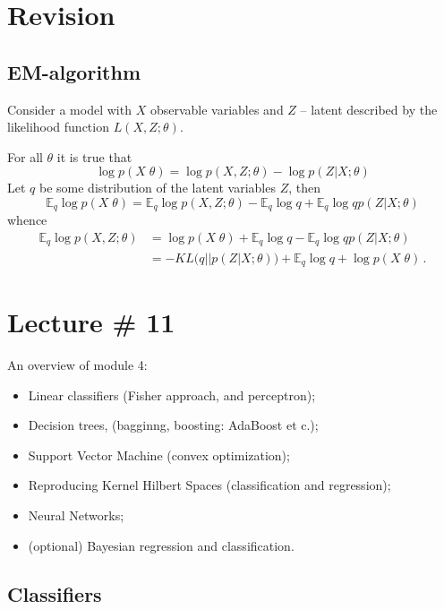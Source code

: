 \documentclass[a4paper]{article}
\newcommand{\ex}{\mathbb{E}}
\begin{document}
\section{Revision} %
\label{sec:revision}

\subsection{EM-algorithm} %
\label{sub:em_algorithm}

Consider a model with $X$ observable variables and $Z$ -- latent described by
the likelihood function $L(X,Z;\theta)$.

For all $\theta$ it is true that 
\[\log p(X\;\theta) = \log p(X,Z;\theta) - \log p(Z\lvert X;\theta)\]
Let $q$ be some distribution of the latent variables $Z$, then
\[ \ex_q\log p(X\;\theta) = \ex_q\log p(X,Z;\theta) - \ex_q \log q + \ex_q\log {q}{p(Z\lvert X;\theta)} \]
whence 
\begin{align*}
\ex_q\log p(X,Z;\theta)
	&= \log p(X\;\theta) + \ex_q \log q - \ex_q\log {q}{p(Z\lvert X;\theta)} \\
	&= - KL\bigl(q\lvert\rvert p(Z\lvert X;\theta)\bigr) + \ex_q \log q + \log p(X\;\theta) \,.
\end{align*}



\section{Lecture \# 11} %
\label{sec:lecture_11}

An overview of module 4:
\begin{itemize}
	\item Linear classifiers (Fisher approach, and perceptron);
	\item Decision trees, (bagginng, boosting: AdaBoost et c.);
	\item Support Vector Machine (convex optimization);
	\item Reproducing Kernel Hilbert Spaces (classification and regression);
	\item Neural Networks;
	\item (optional) Bayesian regression and classification.
\end{itemize}

\subsection{Classifiers} %
\label{sub:classifiers}
\end{document}
